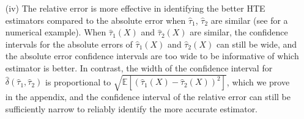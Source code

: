 \documentclass{article}
\theoremstyle{plain}
\theoremstyle{definition}
\def\EE{\mathbb{E}}
\theoremstyle{plain}
\begin{document}
\begin{itemize}
    \item [(iv)] The relative error is more effective in identifying the better HTE estimators compared to the absolute error when $\hat{\tau}_1$, $\hat{\tau}_2$ are similar (see  for a numerical example).
    When $\hat{\tau}_1(X)$ and $\hat{\tau}_2(X)$ are similar, the confidence intervals for the absolute errors of $\hat{\tau}_1(X)$ and $\hat{\tau}_2(X)$ can still be wide, and the absolute error confidence intervals are too wide to be informative of which estimator is better.
    In contrast, the width of the confidence interval for $\hat{\delta}(\hat{\tau}_1, \hat{\tau}_2)$ is proportional to $\sqrt{\EE[(\hat{\tau}_1(X) - \hat{\tau}_2(X))^2]}$, which we prove in the appendix, and the confidence interval of the relative error can still be sufficiently narrow to reliably identify the more accurate estimator.   
\end{itemize}
\end{document}
